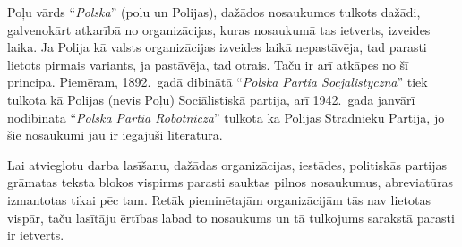 \documentclass[twoside,a5paper,12pt,fleqn,openany]{extbook}
\newcommand{\pltxti}[1]{\textit{\textpolish{#1}}}
\begin{document}
Poļu vārds ``\pltxti{Polska}'' (poļu un Polijas), dažādos nosaukumos tulkots dažādi, galvenokārt atkarībā no organizācijas, kuras nosaukumā tas ietverts, izveides laika.
Ja Polija kā valsts organizācijas izveides laikā nepastāvēja, tad parasti lietots pirmais variants, ja pastāvēja, tad otrais.
Taču ir arī atkāpes no šī principa.
Piemēram, 1892.~gadā dibinātā ``\pltxti{Polska Partia Socjalistyczna}'' tiek tulkota kā Polijas (nevis Poļu) Sociālistiskā partija, arī 1942.~gada janvārī nodibinātā ``\pltxti{Polska Partia Robotnicza}'' tulkota kā Polijas Strādnieku Partija, jo šie nosaukumi jau ir iegājuši literatūrā.

Lai atvieglotu darba lasīšanu, dažādas organizācijas, iestādes, politiskās partijas grāmatas teksta blokos vispirms parasti sauktas
pilnos nosaukumus, abreviatūras izmantotas tikai pēc tam.
Retāk pieminētajām organizācijām tās nav lietotas vispār, taču lasītāju ērtības labad to nosaukums un tā tulkojums sarakstā parasti ir ietverts.
\end{document}
